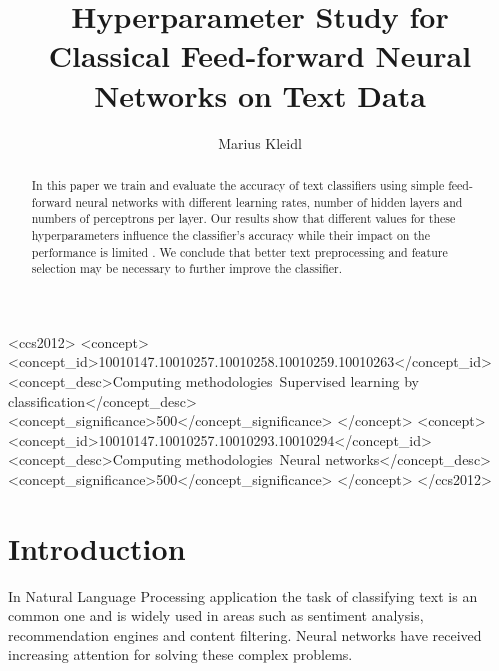 \documentclass[sigconf]{acmart}
\begin{document}
\title{Hyperparameter Study for Classical Feed-forward Neural Networks on Text Data}

\author{Marius Kleidl}


\renewcommand{\shortauthors}{B. Trovato et al.}


\begin{abstract}
	In this paper we train and evaluate the accuracy of text classifiers using simple feed-forward neural networks with different learning rates, number of hidden layers and numbers of perceptrons per layer. Our results show that different values for these hyperparameters influence the classifier's accuracy while their impact on the performance is limited . We conclude that better text preprocessing and feature selection may be necessary to further improve the classifier.
\end{abstract}

%
%
\begin{CCSXML}
	<ccs2012>
	<concept>
	<concept_id>10010147.10010257.10010258.10010259.10010263</concept_id>
	<concept_desc>Computing methodologies~Supervised learning by classification</concept_desc>
	<concept_significance>500</concept_significance>
	</concept>
	<concept>
	<concept_id>10010147.10010257.10010293.10010294</concept_id>
	<concept_desc>Computing methodologies~Neural networks</concept_desc>
	<concept_significance>500</concept_significance>
	</concept>
	</ccs2012>
\end{CCSXML}



\maketitle

\section{Introduction}

In Natural Language Processing application the task of classifying text is an common one and is widely used in areas such as sentiment analysis, recommendation engines and content filtering. Neural networks have received increasing attention for solving these complex problems. 
\end{document}
